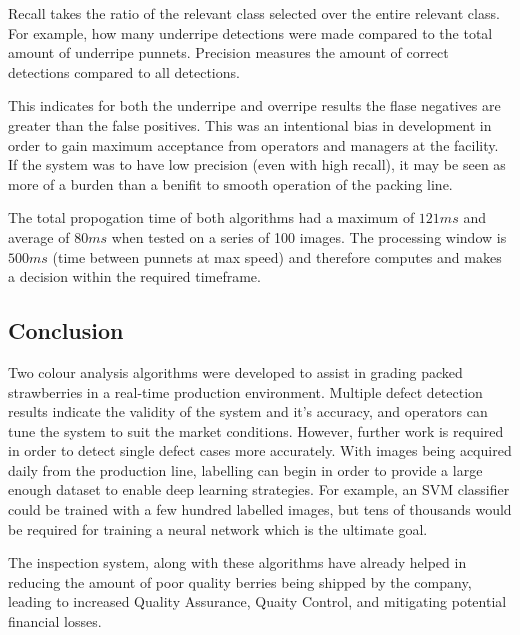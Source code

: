 \documentclass[fleqn,twoside]{article}
\begin{document}
Recall takes the ratio of the relevant class selected over the entire relevant class. For example, how many underripe detections were made compared to the total amount of underripe punnets. Precision measures the amount of correct detections compared to all detections. 

This indicates for both the underripe and overripe results the flase negatives are greater than the false positives. This was an intentional bias in development in order to gain maximum acceptance from operators and managers at the facility. If the system was to have low precision (even with high recall), it may be seen as more of a burden than a benifit to smooth operation of the packing line.

The total propogation time of both algorithms had a maximum of $121ms$ and average of $80ms$ when tested on a series of 100 images. The processing window is $500ms$ (time between punnets at max speed) and therefore computes and makes a decision within the required timeframe.




\subsection{Conclusion}

Two colour analysis algorithms were developed to assist in grading packed strawberries in a real-time production environment. Multiple defect detection results indicate the validity of the system and it's accuracy, and operators can tune the system to suit the market conditions. However, further work is required in order to detect single defect cases more accurately. With images being acquired daily from the production line, labelling can begin in order to provide a large enough dataset to enable deep learning strategies. For example, an SVM classifier could be trained with a few hundred labelled images, but tens of thousands would be required for training a neural network which is the ultimate goal. 


The inspection system, along with these algorithms have already helped in reducing the amount of poor quality berries being shipped by the company, leading to increased Quality Assurance, Quaity Control, and mitigating potential financial losses.



\newpage
\end{document}
